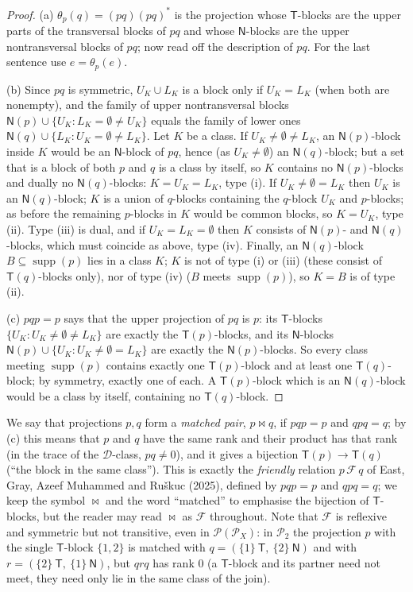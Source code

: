 \documentclass[11pt]{amsart}
\theoremstyle{definition}
\newcommand{\D}{\mathcal{D}}
\renewcommand{\P}{\mathcal{P}}
\newcommand{\supp}{\operatorname{supp}}
\newcommand{\T}{\mathsf{T}}
\newcommand{\N}{\mathsf{N}}
\newcommand{\mt}{\bowtie}   %
\begin{document}
\begin{proof}
(a) $\theta_p(q)=(pq)(pq)^*$ is the projection whose $\T$-blocks are the upper parts of the transversal blocks of $pq$ and whose $\N$-blocks are the upper nontransversal blocks of $pq$; now read off the description of $pq$. For the last sentence use $e=\theta_p(e)$.

(b) Since $pq$ is symmetric, $U_K\cup L_K$ is a block only if $U_K=L_K$ (when both are nonempty), and the family of upper nontransversal blocks $\N(p)\cup\{U_K:L_K=\emptyset\ne U_K\}$ equals the family of lower ones $\N(q)\cup\{L_K:U_K=\emptyset\ne L_K\}$. Let $K$ be a class. If $U_K\ne\emptyset\ne L_K$, an $\N(p)$-block inside $K$ would be an $\N$-block of $pq$, hence (as $U_K\neq\emptyset$) an $\N(q)$-block; but a set that is a block of both $p$ and $q$ is a class by itself, so $K$ contains no $\N(p)$-blocks and dually no $\N(q)$-blocks: $K=U_K=L_K$, type (i). If $U_K\ne\emptyset=L_K$ then $U_K$ is an $\N(q)$-block; $K$ is a union of $q$-blocks containing the $q$-block $U_K$ and $p$-blocks; as before the remaining $p$-blocks in $K$ would be common blocks, so $K=U_K$, type (ii). Type (iii) is dual, and if $U_K=L_K=\emptyset$ then $K$ consists of $\N(p)$- and $\N(q)$-blocks, which must coincide as above, type (iv). Finally, an $\N(q)$-block $B\subseteq\supp(p)$ lies in a class $K$; $K$ is not of type (i) or (iii) (these consist of $\T(q)$-blocks only), nor of type (iv) ($B$ meets $\supp(p)$), so $K=B$ is of type (ii).

(c) $pqp=p$ says that the upper projection of $pq$ is $p$: its $\T$-blocks $\{U_K: U_K\ne\emptyset\ne L_K\}$ are exactly the $\T(p)$-blocks, and its $\N$-blocks $\N(p)\cup\{U_K:U_K\ne\emptyset=L_K\}$ are exactly the $\N(p)$-blocks. So every class meeting $\supp(p)$ contains exactly one $\T(p)$-block and at least one $\T(q)$-block; by symmetry, exactly one of each. A $\T(p)$-block which is an $\N(q)$-block would be a class by itself, containing no $\T(q)$-block.
\end{proof}

We say that projections $p,q$ form a \emph{matched pair}, $p\mt q$, if $pqp=p$ and $qpq=q$; by (c) this means that $p$ and $q$ have the same rank and their product has that rank (in the trace of the $\D$-class, $pq\ne0$), and it gives a bijection $\T(p)\to\T(q)$ (``the block in the same class''). This is exactly the \emph{friendly} relation $p\,\mathcal F\,q$ of East, Gray, Azeef Muhammed and Ru\v skuc (2025), defined by $pqp=p$ and $qpq=q$; we keep the symbol $\mt$ and the word ``matched'' to emphasise the bijection of $\T$-blocks, but the reader may read $\mt$ as $\mathcal F$ throughout. Note that $\mathcal F$ is reflexive and symmetric but not transitive, even in $\P(\P_X)$: in $\P_2$ the projection $p$ with the single $\T$-block $\{1,2\}$ is matched with $q=(\{1\}\ \T,\ \{2\}\ \N)$ and with $r=(\{2\}\ \T,\ \{1\}\ \N)$, but $qrq$ has rank $0$ (a $\T$-block and its partner need not meet, they need only lie in the same class of the join).
\end{document}
